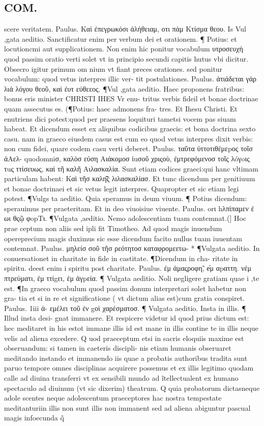\documentclass{article}
\begin{document}
\begin{pages}
\section*{COM. }
\marginpar{[ p.4. ]}\pstart scere veritatem. Paulus. Καὶ ἐπεγρωκόσι ἀλήθειαμ, οτι πὰμ Κτίσμα θεου. Is Vul ,gata aeditio. Sanctificatur enim per verbum dei et orationem. ¶ Potius: et locutioncmi aut supplicationem. Non enim hic ponitur vocabulum υτροσευχὴ quod passim oratio verti solet vt in principio secundi capitis hutus vbi dicitur. Obsecro igitur primum om nium vt fiant preces orationes. sed ponitur vocabulum: quod vetus interpres illic ver- tit postulationes. Paulus. ἀτιάδεται γἀρ λιἀ λόγου θεοῦ, καὶ ἐυτ εύθεεος. ¶Vul ,gata aeditio. Haec proponens fratribus: bonus eris minister CHRISTI IHES Vr enu- tritus verbis fideil et bonae doctrinae quam assecutus es. (¶Potius: haec admonens fra- tres. Et Ihesu Christi. Et enutriens dici potest:quod per praesens loquituri tametsi vocem pas siuam habeat. Et dicendum esset ex aliquibus codicibus graecis: et bona doctrina sexto casu. nam in graeco eiusdem casus est cum eo quod vetus interpres dixit verbis: non cum fidei, quare codem casu verti deberet. Paulus. ταῦτα ὐττοτιθέμεpος τοῖσ ἀAελ- quodomniσ, καλὸσ εὐση Αιάκομοσ ἰuσοῦ χριςοὺ, ἐμτρεφόμενοσ τοῖς λóγoις τuς ττίσευως, καὶ τῆ καλῆ Αιλασκαλία. Sunt etiam codices graeci:qui hanc vltimam particulam habent: Καὶ τῆσ καλη̃͂ς λιλασκαλίασ. Et tunc dicendum per genitiuum et bonae doctrinaei et sic vetus legit interpres. Quapropter et sic etiam legi potest. ¶Vulgs ta aeditio. Quia speramus in deum viuum. ¶ Potius dicendum: sperauimus per praeteritam. Et in deo viuoisiue viuente. Paulus. orι hλπίπαμεν ἐ ωι θςῷ φopTι. ¶Vulgata ,aeditio. Nemo adolescentiam tuam contemnat.(] Hoc prae ceptum non aliis sed ipli fit Timotheo. Ad quod magis inuendum opereprecium magis duximus sic esse dicendum facito nullus tuam iuuentam contemnat. Paulus. μηλείσ σοῦ τῆσ ρεότητοσ καταφρομεετω- * ¶Vulgata aeditio. In conuersationet in charitate in fide in castitate. ¶Dicendum in cha- ritate in spiritu. deest enim i spiritu post charitate. Paulus. ἐμ ἀμαςροφη̃, e̓μ αpαττη. νἐμ πτρεύματι, ἐμ ττίgει, ἐμ ἀγpεία. ¶ Vulgata aeditio. Noli negligere gratiam quae i ,te est. ¶In graeco vocabulum quod passim donum interpretari solet habetur non gra- tia et si in re et significatione ( vt dictum alias est)cum gratia conspiret. Paulus. 1iii ἀ- εμέλει τοῦ ἐν gοὶ χαρέσματοσ. ¶ Vulgata aeditio. Insta in illis. ¶ Illud insta desi- gnat immanere. Et respicere videtur id quod prius dictum est: hec meditaret in his estot immane illis id est mane in illis contine te in illis neque velis ad aliena excedere. Q uod praeceptum etsi in sacris eloquiis maxime est obseruandum: si tamen in caeteris discipli- nis etiam humanis obseruaret meditando instando et immanendo iis quae a probatis authoribus tradita sunt paruo tempore omnes disciplinas acquirere possemus et ex illis legitimo quodam calle ad diuina transferri vt ex sensibili mundo ad ĩtellectualent ex humano spectaculo ad diuinum (vt sic dixerim) theatrum. Q quia probatorum dictasneque adole scentes neque adolescentum praeceptores hac nostra tempestate meditanturiin illis non sunt illis non immanent sed ad aliena abiguntur pascual magis infoecunda q̃ 
\end{pages}
\end{document}
